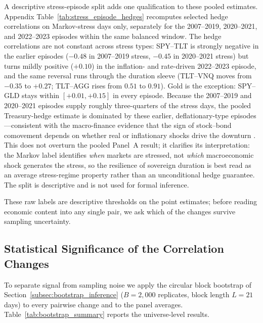 A descriptive stress-episode split adds one qualification to these pooled estimates. Appendix Table~\ref{tab:stress_episode_hedges} recomputes selected hedge correlations on Markov-stress days only, separately for the 2007--2019, 2020--2021, and 2022--2023 episodes within the same balanced window. The hedge correlations are not constant across stress types: SPY--TLT is strongly negative in the earlier episodes ($-0.48$ in 2007--2019 stress, $-0.45$ in 2020--2021 stress) but turns mildly positive ($+0.10$) in the inflation- and rate-driven 2022--2023 episode, and the same reversal runs through the duration sleeve (TLT--VNQ moves from $-0.35$ to $+0.27$; TLT--AGG rises from $0.51$ to $0.91$). Gold is the exception: SPY--GLD stays within $[+0.01, +0.15]$ in every episode. Because the 2007--2019 and 2020--2021 episodes supply roughly three-quarters of the stress days, the pooled Treasury-hedge estimate is dominated by these earlier, deflationary-type episodes---consistent with the macro-finance evidence that the sign of stock--bond comovement depends on whether real or inflationary shocks drive the downturn \citep{campbell2020macro}. This does not overturn the pooled Panel~A result; it clarifies its interpretation: the Markov label identifies \emph{when} markets are stressed, not \emph{which} macroeconomic shock generates the stress, so the resilience of sovereign duration is best read as an average stress-regime property rather than an unconditional hedge guarantee. The split is descriptive and is not used for formal inference.

These raw labels are descriptive thresholds on the point estimates; before reading economic content into any single pair, we ask which of the changes survive sampling uncertainty.

\subsection{Statistical Significance of the Correlation Changes}
\label{subsec:results_bootstrap}

To separate signal from sampling noise we apply the circular block bootstrap of Section~\ref{subsec:bootstrap_inference} ($B = 2{,}000$ replicates, block length $L = 21$ days) to every pairwise change and to the panel averages. Table~\ref{tab:bootstrap_summary} reports the universe-level results.

